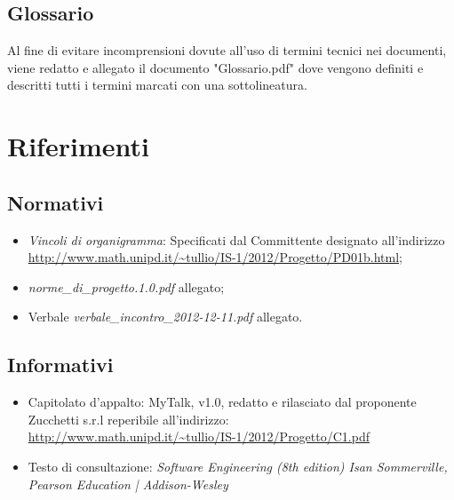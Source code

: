 \subsection{Glossario}
Al fine di evitare incomprensioni dovute all'uso di termini tecnici nei documenti, viene redatto e allegato il documento "Glossario.pdf" dove vengono definiti e descritti tutti i termini marcati con una sottolineatura.

\section{Riferimenti}
\subsection{Normativi}
\begin{itemize}
\item \textit{Vincoli di organigramma}: Specificati dal Committente designato all'indirizzo\\ \url{http://www.math.unipd.it/~tullio/IS-1/2012/Progetto/PD01b.html};
\item \textit{norme\_di\_progetto.1.0.pdf} allegato;
\item Verbale \textit{verbale\_incontro\_2012-12-11.pdf} allegato.
\end{itemize}

\subsection{Informativi}
\begin{itemize}
\item Capitolato d'appalto: MyTalk, v1.0, redatto e rilasciato dal proponente Zucchetti s.r.l reperibile all'indirizzo: \\ \url{http://www.math.unipd.it/~tullio/IS-1/2012/Progetto/C1.pdf}
\item Testo di consultazione: \textit{Software Engineering (8th edition) Isan Sommerville, Pearson Education | Addison-Wesley}
\end{itemize}
\clearpage
